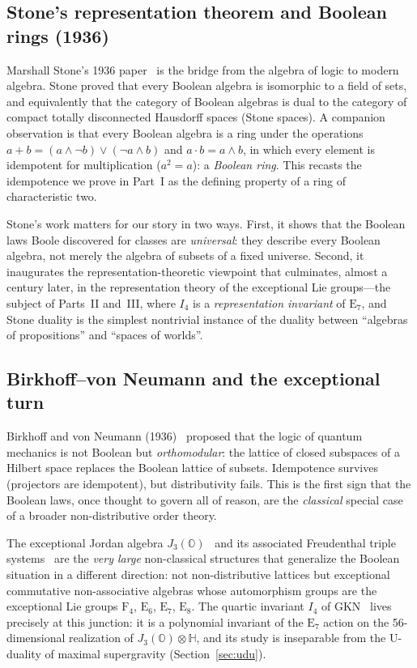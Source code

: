 \documentclass[11pt]{article}
\theoremstyle{definition}
\newcommand{\OO}{\mathbb{O}}
\newcommand{\HH}{\mathbb{H}}
\newcommand{\Jthree}{J_3(\OO)}
\newcommand{\Iq}{I_4}
\newcommand{\Eseven}{\mathrm{E}_7}
\begin{document}
\subsection{Stone's representation theorem and Boolean rings (1936)}
\label{sec:hist-stone}

Marshall Stone's 1936 paper~\cite{stone1936} is the bridge from the algebra of
logic to modern algebra. Stone proved that every Boolean algebra is isomorphic
to a field of sets, and equivalently that the category of Boolean algebras is
dual to the category of compact totally disconnected Hausdorff spaces (Stone
spaces). A companion observation is that every Boolean algebra is a ring under
the operations $a+b = (a\land\neg b)\lor(\neg a\land b)$ and
$a\cdot b = a\land b$, in which every element is idempotent for multiplication
($a^2=a$): a \emph{Boolean ring}. This recasts the idempotence we prove in
Part~I as the defining property of a ring of characteristic two.

Stone's work matters for our story in two ways. First, it shows that the
Boolean laws Boole discovered for classes are \emph{universal}: they describe
every Boolean algebra, not merely the algebra of subsets of a fixed universe.
Second, it inaugurates the representation-theoretic viewpoint that culminates,
almost a century later, in the representation theory of the exceptional Lie
groups---the subject of Parts~II and~III, where $\Iq$ is a \emph{representation
invariant} of $\Eseven$, and Stone duality is the simplest nontrivial instance
of the duality between ``algebras of propositions'' and ``spaces of worlds''.

\subsection{Birkhoff--von Neumann and the exceptional turn}
\label{sec:hist-bvn}

Birkhoff and von Neumann (1936)~\cite{bvn1936} proposed that the logic of
quantum mechanics is not Boolean but \emph{orthomodular}: the lattice of
closed subspaces of a Hilbert space replaces the Boolean lattice of subsets.
Idempotence survives (projectors are idempotent), but distributivity fails.
This is the first sign that the Boolean laws, once thought to govern all of
reason, are the \emph{classical} special case of a broader non-distributive
order theory.

The exceptional Jordan algebra $\Jthree$~\cite{freudenthal1954,brown1969} and
its associated Freudenthal triple systems~\cite{meyberg1970} are the
\emph{very large} non-classical structures that generalize the Boolean
situation in a different direction: not non-distributive lattices but
exceptional commutative non-associative algebras whose automorphism groups are
the exceptional Lie groups $\mathrm{F}_4$, $\mathrm{E}_6$, $\mathrm{E}_7$,
$\mathrm{E}_8$. The quartic invariant $\Iq$ of GKN~\cite{gkn2001} lives
precisely at this junction: it is a polynomial invariant of the
$\mathrm{E}_7$ action on the 56-dimensional realization of $\Jthree\otimes\HH$,
and its study is inseparable from the U-duality of maximal supergravity
(Section~\ref{sec:udu}).
\end{document}
